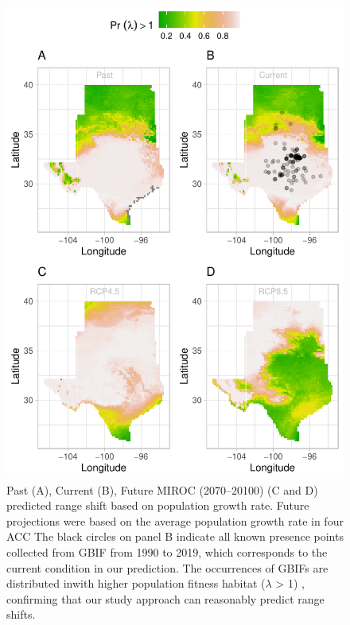 \documentclass[12pt]{article}
\begin{document}
\begin{figure}[H]
  \begin{center}
    \includegraphics[width=0.78\linewidth]{Figures/Fig_geoPrlambdaprojection_miroc.pdf}
  \caption{Past (A), Current (B), Future MIROC (2070–20100) (C and D) predicted range shift based on population growth rate. Future projections were based on the average population growth rate in four ACC The black circles on panel B indicate all known presence points collected from GBIF from 1990 to 2019, which corresponds to the current condition in our prediction.  The occurrences of GBIFs are distributed inwith higher population fitness habitat ($\lambda$ > 1) , confirming that our study approach can reasonably predict range shifts. }
  \label{Sup:geoprojmiroc}
  \end{center}
\end{figure}
\end{document}
